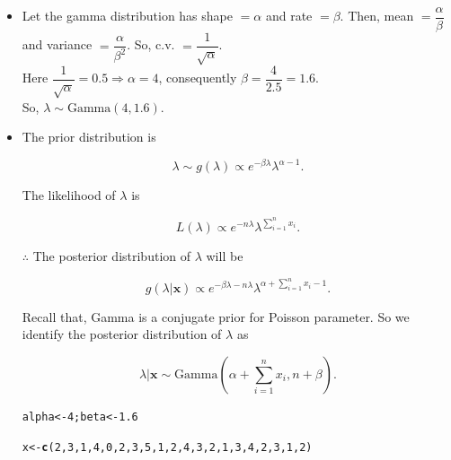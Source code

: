 \documentclass[11pt, a4paper]{article}\usepackage[]{graphicx}\usepackage[]{xcolor}
\makeatletter
\newcommand{\hlnum}[1]{\textcolor[rgb]{0.686,0.059,0.569}{#1}}%
\newcommand{\hldef}[1]{\textcolor[rgb]{0.345,0.345,0.345}{#1}}%
\newcommand{\hlkwb}[1]{\textcolor[rgb]{0.69,0.353,0.396}{#1}}%
\newcommand{\hlkwd}[1]{\textcolor[rgb]{0.737,0.353,0.396}{\textbf{#1}}}%
\newenvironment{kframe}{%
 \def\at@end@of@kframe{}%
 \ifinner\ifhmode%
  \def\at@end@of@kframe{\end{minipage}}%
  \begin{minipage}{\columnwidth}%
 \fi\fi%
 \def\FrameCommand##1{\hskip\@totalleftmargin \hskip-\fboxsep
 \colorbox{shadecolor}{##1}\hskip-\fboxsep
     \hskip-\linewidth \hskip-\@totalleftmargin \hskip\columnwidth}%
 \MakeFramed {\advance\hsize-\width
   \@totalleftmargin\z@ \linewidth\hsize
   \@setminipage}}%
 {\par\unskip\endMakeFramed%
 \at@end@of@kframe}
\newenvironment{knitrout}{}{} %
\makeatother
\begin{document}
\begin{itemize}

\item[\scalebox{2.0}{\twemoji{keycap: 1}}] \hspace{0.1cm} Let the gamma distribution has shape $ = \alpha$ and rate $= \beta$. Then, mean $ = \dfrac{\alpha}{\beta}$ and variance $ = \dfrac{\alpha}{\beta^2}$. So, c.v. $ = \dfrac{1}{\sqrt{\alpha}}$.\\[0.3em] 

Here $\dfrac{1}{\sqrt{\alpha}} = 0.5 \Rightarrow \alpha = 4$, consequently $\beta = \dfrac{4}{2.5} = 1.6$.\\[0.3em]

So, $\lambda \sim \text{Gamma}(4, 1.6)$.

\item[\scalebox{2.0}{\twemoji{keycap: 2}}] \hspace{0.1cm} The prior distribution is 

$$\lambda \sim g(\lambda) \propto e^{-\beta \lambda} {\lambda}^{\alpha - 1}.$$

The likelihood of $\lambda$ is

$$L(\lambda) \propto e^{-n \lambda} {\lambda}^{\sum \limits_{i = 1}^{n} x_i}.$$

$\therefore$ The posterior distribution of $\lambda$ will be

$$g(\lambda | \mathbf{x}) \propto e^{-\beta \lambda - n \lambda } {\lambda}^{\alpha + \sum \limits_{i = 1}^{n} x_i - 1}.$$

Recall that, Gamma is a conjugate prior for Poisson parameter. So we identify the posterior distribution of $\lambda$ as

$$\lambda | \mathbf{x} \sim \text{Gamma}\left( \alpha + \sum \limits_{i = 1}^{n} x_i, n + \beta \right).$$

\begin{knitrout}
\color{fgcolor}\begin{kframe}
\begin{alltt}
\hldef{alpha} \hlkwb{<-} \hlnum{4}\hldef{; beta} \hlkwb{<-} \hlnum{1.6}
\end{alltt}
\end{kframe}
\end{knitrout}

\begin{knitrout}
\color{fgcolor}\begin{kframe}
\begin{alltt}
\hldef{x} \hlkwb{<-} \hlkwd{c}\hldef{(}\hlnum{2}\hldef{,} \hlnum{3}\hldef{,} \hlnum{1}\hldef{,} \hlnum{4}\hldef{,} \hlnum{0}\hldef{,} \hlnum{2}\hldef{,} \hlnum{3}\hldef{,} \hlnum{5}\hldef{,} \hlnum{1}\hldef{,} \hlnum{2}\hldef{,} \hlnum{4}\hldef{,} \hlnum{3}\hldef{,} \hlnum{2}\hldef{,} \hlnum{1}\hldef{,} \hlnum{3}\hldef{,} \hlnum{4}\hldef{,} \hlnum{2}\hldef{,} \hlnum{3}\hldef{,} \hlnum{1}\hldef{,} \hlnum{2}\hldef{)}
\end{alltt}
\end{kframe}
\end{knitrout}


\end{itemize}
\end{document}
